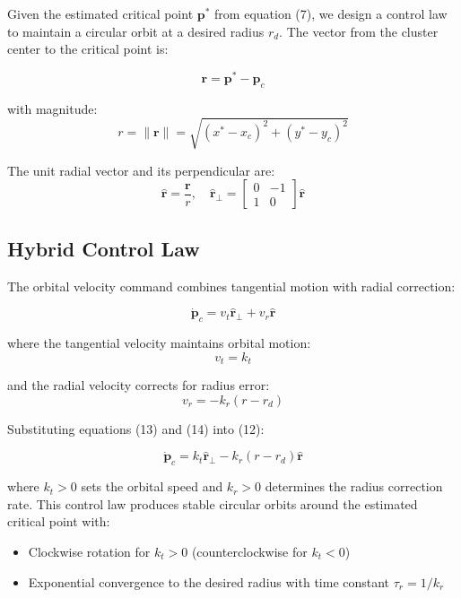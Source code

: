 \documentclass[lettersize,journal]{IEEEtran}
\begin{document}
Given the estimated critical point $\mathbf{p}^*$ from equation (7), we design a control law to maintain a circular orbit at a desired radius $r_d$. The vector from the cluster center to the critical point is:

\begin{equation}
\mathbf{r} = \mathbf{p}^* - \mathbf{p}_c
\end{equation}

with magnitude:
\begin{equation}
r = \|\mathbf{r}\| = \sqrt{(x^* - x_c)^2 + (y^* - y_c)^2}
\end{equation}

The unit radial vector and its perpendicular are:
\begin{equation}
\hat{\mathbf{r}} = \frac{\mathbf{r}}{r}, \quad \hat{\mathbf{r}}_\perp = \begin{bmatrix} 0 & -1 \\ 1 & 0 \end{bmatrix} \hat{\mathbf{r}}
\end{equation}

\subsection{Hybrid Control Law}

The orbital velocity command combines tangential motion with radial correction:

\begin{equation}
\dot{\mathbf{p}}_c = v_t \hat{\mathbf{r}}_\perp + v_r \hat{\mathbf{r}}
\end{equation}

where the tangential velocity maintains orbital motion:
\begin{equation}
v_t = k_t
\end{equation}

and the radial velocity corrects for radius error:
\begin{equation}
v_r = -k_r(r - r_d)
\end{equation}


Substituting equations (13) and (14) into (12):

\begin{equation}
\dot{\mathbf{p}}_c = k_t \hat{\mathbf{r}}_\perp - k_r(r - r_d)\hat{\mathbf{r}}
\end{equation}

where $k_t > 0$ sets the orbital speed and $k_r > 0$ determines the radius correction rate. This control law produces stable circular orbits around the estimated critical point with:
\begin{itemize}
\item Clockwise rotation for $k_t > 0$ (counterclockwise for $k_t < 0$)
\item Exponential convergence to the desired radius with time constant $\tau_r = 1/k_r$
\end{itemize}
\end{document}
